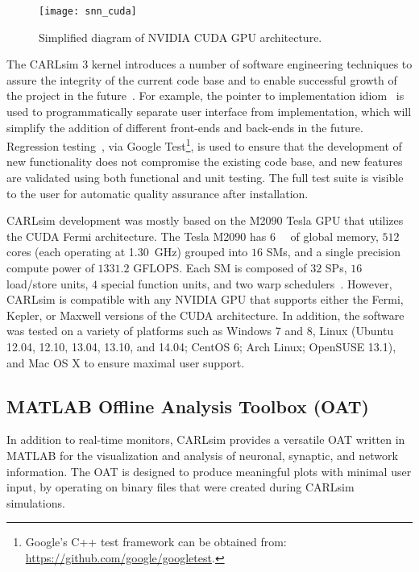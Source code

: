 \begin{figure}[t]
  \centering
  \texttt{[image: snn\_cuda]}
  \caption{Simplified diagram of NVIDIA \ac{CUDA} \ac{GPU} architecture.}
  \label{fig:SNN|CUDA}
\end{figure}

The CARLsim 3 kernel introduces a number of software
engineering techniques to assure the integrity of the current
code base and to enable successful growth of the project in the
future~\citep{Beyeler2015a}.
For example, the pointer to implementation
idiom~\citep[Chapter~5: Hiding the Implementation]{Eckel2000}
is used to programmatically separate user interface from
implementation, which will simplify the addition of different
front-ends and back-ends in the future.
Regression testing~\citep{Kolawa2007}, via
Google Test\footnote{Google's C++ test framework can be obtained from: \url{https://github.com/google/googletest}.},
is used to ensure that the development of new
functionality does not compromise the existing code base, and
new features are validated using both functional and unit testing.
The full test suite is visible to the user for automatic quality
assurance after installation.

CARLsim development was mostly based on the M2090
Tesla \ac{GPU} that utilizes the \ac{CUDA} Fermi architecture.
The Tesla M2090 has \SI{6}{\giga\byte} of global memory, $512$ cores (each
operating at \SI{1.30}{\giga\hertz}) grouped into $16$ \acp{SM}, and a single precision compute power of $1331.2$ GFLOPS.
Each \ac{SM} is composed of $32$ SPs, $16$ load/store units, 
$4$ special function units, and two warp 
schedulers~\citep{NVIDIAFermi2009}.
However, CARLsim is compatible with any NVIDIA \ac{GPU} that 
supports either the Fermi, Kepler, or Maxwell versions of the
\ac{CUDA} architecture.
In addition, the software was tested on a variety of platforms
such as Windows 7 and 8, Linux (Ubuntu 12.04, 12.10, 13.04, 13.10, and 14.04; 
CentOS 6; Arch Linux; OpenSUSE 13.1), and Mac OS X
to ensure maximal user support.



\subsection{MATLAB Offline Analysis Toolbox (OAT)}
\label{sec:SNN|OAT}

In addition to real-time monitors, CARLsim provides a versatile
\acf{OAT} written in MATLAB for the visualization and analysis
of neuronal, synaptic, and network information.
The \ac{OAT} is designed to produce meaningful plots with minimal
user input, by operating on binary files that were
created during CARLsim simulations.

